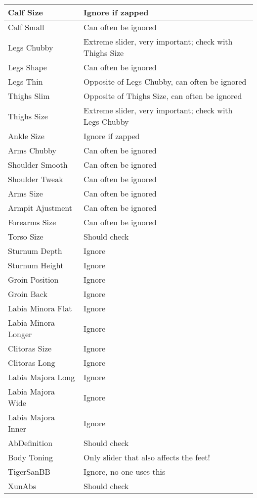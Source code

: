\begin{longtable}{| p{} | p{} |}
    Calf Size & Ignore if zapped \\ \hline
    Calf Small & Can often be ignored \\ \hline
    Legs Chubby & Extreme slider, very important; check with Thighs Size \\ \hline
    Legs Shape & Can often be ignored \\ \hline
    Legs Thin & Opposite of Legs Chubby, can often be ignored \\ \hline
    Thighs Slim & Opposite of Thighs Size, can often be ignored \\ \hline
    Thighs Size & Extreme slider, very important; check with Legs Chubby \\ \hline
    Ankle Size & Ignore if zapped \\ \hline
    Arms Chubby & Can often be ignored \\ \hline
    Shoulder Smooth & Can often be ignored \\ \hline
    Shoulder Tweak & Can often be ignored \\ \hline
    Arms Size & Can often be ignored \\ \hline
    Armpit Ajustment & Can often be ignored \\ \hline
    Forearms Size & Can often be ignored \\ \hline
    Torso Size & Should check \\ \hline
    Sturnum Depth & Ignore \\ \hline
    Sturnum Height & Ignore \\ \hline
    Groin Position & Ignore \\ \hline
    Groin Back & Ignore \\ \hline
    Labia Minora Flat & Ignore \\ \hline
    Labia Minora Longer & Ignore \\ \hline
    Clitoras Size & Ignore \\ \hline
    Clitoras Long & Ignore \\ \hline
    Labia Majora Long & Ignore \\ \hline
    Labia Majora Wide & Ignore \\ \hline
    Labia Majora Inner & Ignore \\ \hline
    AbDefinition & Should check \\ \hline
    Body Toning & Only slider that also affects the feet! \\ \hline
    TigerSanBB & Ignore, no one uses this \\ \hline
    XunAbs & Should check \\ \hline

\end{longtable}
